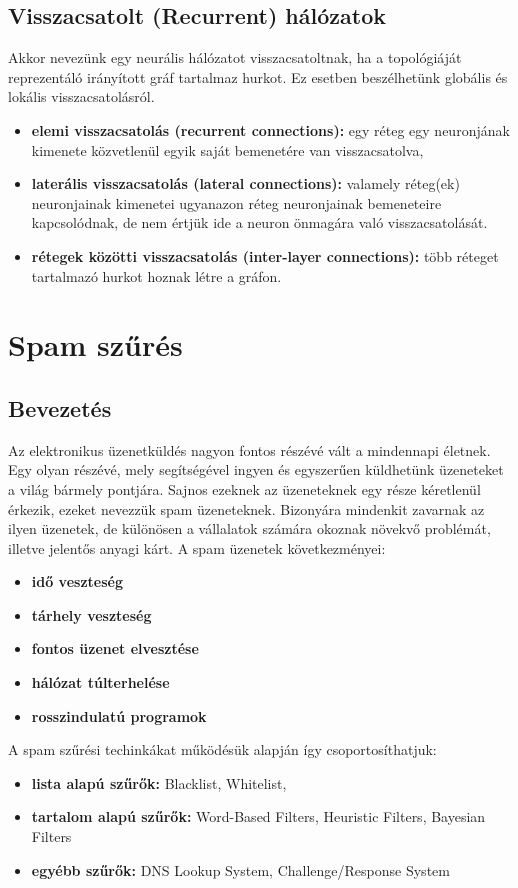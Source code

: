 \documentclass[a4paper]{article}
\begin{document}
\subsection{Visszacsatolt (Recurrent) hálózatok}
Akkor nevezünk egy neurális hálózatot visszacsatoltnak, ha a topológiáját reprezentáló irányított gráf tartalmaz hurkot. Ez esetben beszélhetünk globális és lokális visszacsatolásról.

\begin{itemize}
    \item\textbf{elemi visszacsatolás (recurrent connections):} egy réteg egy neuronjának kimenete közvetlenül egyik saját bemenetére van visszacsatolva,
    \item\textbf{laterális visszacsatolás (lateral connections):} valamely réteg(ek) neuronjainak kimenetei ugyanazon réteg neuronjainak bemeneteire kapcsolódnak, de nem értjük ide a neuron önmagára való visszacsatolását.
    \item\textbf{rétegek közötti visszacsatolás (inter-layer connections):} több réteget tartalmazó hurkot hoznak létre a gráfon.
\end{itemize}

\section{Spam szűrés}
\subsection{Bevezetés}
Az elektronikus üzenetküldés nagyon fontos részévé vált a mindennapi életnek. Egy olyan részévé, mely segítségével ingyen és egyszerűen küldhetünk üzeneteket a világ bármely pontjára. Sajnos ezeknek az üzeneteknek egy része kéretlenül érkezik, ezeket nevezzük spam üzeneteknek. Bizonyára mindenkit zavarnak az ilyen üzenetek, de különösen a vállalatok számára okoznak növekvő problémát, illetve jelentős anyagi kárt. A spam üzenetek következményei:
\begin{itemize}
    \item\textbf{idő veszteség}
    \item\textbf{tárhely veszteség}
    \item\textbf{fontos üzenet elvesztése}
    \item\textbf{hálózat túlterhelése} 
    \item\textbf{rosszindulatú programok}  
\end{itemize}

\noindent
A spam szűrési techinkákat működésük alapján így csoportosíthatjuk:
\begin{itemize}
    \item\textbf{lista alapú szűrők:} Blacklist, Whitelist,
    \item\textbf{tartalom alapú szűrők:} Word-Based Filters, Heuristic Filters, Bayesian Filters
    \item\textbf{egyébb szűrők:} DNS Lookup System, Challenge/Response System
\end{itemize}
\end{document}
